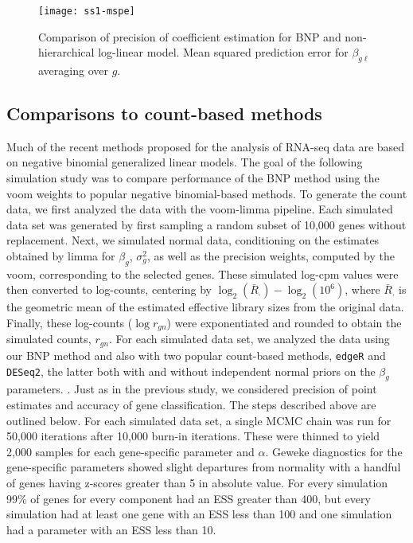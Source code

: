 \begin{figure}[ht!]
\centering
\texttt{[image: ss1-mspe]}
\begin{minipage}{.8\textwidth}
\caption{\small Comparison of precision of coefficient estimation for BNP and non-hierarchical log-linear model. Mean squared prediction error for $\beta_{g\ell}$ averaging over $g$.}
\label{mspe-ss1}
\end{minipage}
\end{figure}

\subsection{Comparisons to count-based methods}
\label{sec:ss2}
Much of the recent methods proposed for the analysis of RNA-seq data are based on negative binomial generalized linear models. The goal of the following simulation study was to compare performance of the BNP method using the voom weights to popular negative binomial-based methods. To generate the count data, we first analyzed the \citet{paschold} data with the voom-limma pipeline. Each simulated data set was generated by first sampling a random subset of 10,000 genes without replacement. Next, we simulated normal data, conditioning on the estimates obtained by limma for $\beta_g$, $\sigma^2_g$, as well as the precision weights, computed by the voom, corresponding to the selected genes. These simulated log-cpm values were then converted to log-counts, centering by $\log_2(\bar{R}_\cdot)-\log_2(10^6)$, where $\bar{R}_\cdot$ is the geometric mean of the estimated effective library sizes from the original data. Finally, these log-counts ($\log r_{gn}$) were exponentiated and rounded to obtain the simulated counts, $r_{gn}$. For each simulated data set, we analyzed the data using our BNP method and also with two popular count-based methods, \texttt{edgeR} and \texttt{DESeq2}, the latter both with and without independent normal priors on the $\beta_g$ parameters. \citep{edger2010,deseq2014}. Just as in the previous study, we considered precision of point estimates and accuracy of gene classification. The steps described above are outlined below. For each simulated data set, a single MCMC chain was run for 50,000 iterations after 10,000 burn-in iterations. These were thinned to yield 2,000 samples for each gene-specific parameter and $\alpha$. Geweke diagnostics for the gene-specific parameters showed slight departures from normality with a handful of genes having z-scores greater than 5 in absolute value. For every simulation 99\% of genes for every component had an ESS greater than 400, but every simulation had at least one gene with an ESS less than 100 and one simulation had a parameter with an ESS less than 10.

